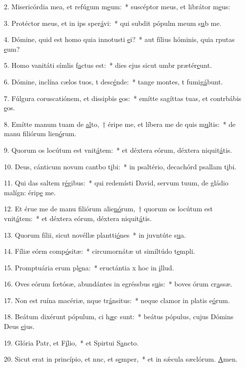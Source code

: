 2. Misericórdia mea, et refúgum m\uline{e}um:~* suscéptor meus, et librátor m\uline{e}us:\par 
3. Protéctor meus, et in ips sper\uline{á}vi:~* qui subdit pópulm meum s\uline{u}b me.\par 
4. Dómine, quid est homo quia innotusti \uline{e}i?~* aut fílius hóminis, quia rputas \uline{e}um?\par 
5. Homo vanitáti símlis f\uline{a}ctus est:~* dies ejus sicut umbr prætér\uline{e}unt.\par 
6. Dómine, inclína cælos tuos, t desc\uline{é}nde:~* tange montes, t fumig\uline{á}bunt.\par 
7. Fúlgura coruscatiónem, et dissipbis \uline{e}os:~* emítte sagíttas tuas, et contrbábis \uline{e}os.\par 
8. Emítte manum tuam de \uline{al}to,~† éripe me, et líbera me de quis m\uline{u}ltis:~* de manu filiórum lien\uline{ó}rum.\par 
9. Quorum os locútum est vnit\uline{á}tem:~* et déxtera eórum, déxtera niquit\uline{á}tis.\par 
10. Deus, cánticum novum cantbo t\uline{i}bi:~* in psaltério, decachórd psallam t\uline{i}bi.\par 
11. Qui das saltem r\uline{é}gibus:~* qui redemísti David, servum tuum, de gládio malígn: érip\uline{e} me.\par 
12. Et érue me de manu filiórum alie\uline{nó}rum,~† quorum os locútum est vnit\uline{á}tem:~* et déxtera eórum, déxtera niquit\uline{á}tis.\par 
13. Quorum fílii, sicut novéllæ plantti\uline{ó}nes~* in juvntúte s\uline{u}a.\par 
14. Fíliæ eórm comp\uline{ó}sitæ:~* circumornátæ ut similtúdo t\uline{e}mpli.\par 
15. Promptuária erum pl\uline{e}na:~* eructántia x hoc in \uline{i}llud.\par 
16. Oves eórum fœtósæ, abundántes in egréssbus s\uline{u}is:~* boves órum cr\uline{a}ssæ.\par 
17. Non est ruína macériæ, nque tr\uline{á}nsitus:~* neque clamor in platis e\uline{ó}rum.\par 
18. Beátum dixérunt pópulum, ci h\uline{æ}c sunt:~* beátus pópulus, cujus Dómins Deus \uline{e}jus.\par 
19. Glória Patr, et F\uline{í}lio,~* et Spirtui S\uline{a}ncto.\par 
20. Sicut erat in princípio, et nnc, et s\uline{e}mper,~* et in sǽcula sæclórum. \uline{A}men.\par 
